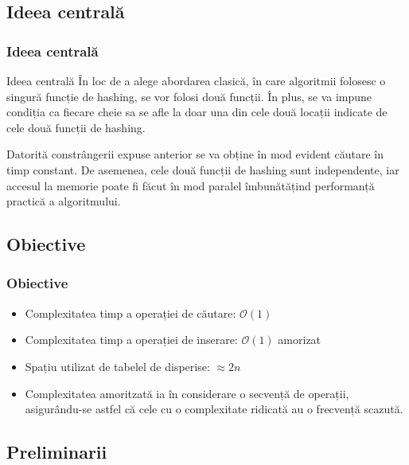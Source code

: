 \documentclass{beamer}
\begin{document}
\begin{frame}
\subsection{Ideea centrală}
\frametitle{Ideea centrală}
\begin{block}{Ideea centrală}
În loc de a alege abordarea clasică, în care algoritmii folosesc o singură funcție de hashing, se vor folosi două funcții. În plus, se va impune condiția ca fiecare cheie sa se afle la doar una din cele două locații indicate de cele două funcții de hashing.
\end{block}


Datorită constrângerii expuse anterior se va obține în mod evident căutare în timp constant. De asemenea, cele două funcții de hashing sunt independente, iar accesul la memorie poate fi făcut în mod paralel îmbunătățind performanță practică a algoritmului.

\end{frame}
\subsection{Obiective}

\begin{frame}
\frametitle{Obiective}
\begin{itemize}
\item Complexitatea timp a operației de căutare: $\mathcal{O}(1)$
\item Complexitatea timp a operației de inserare: $\mathcal{O}(1)$ amorizat
\item Spațiu utilizat de tabelel de disperise: $\approx 2n$

\item Complexitatea amoritzată ia în considerare o secvență de operații, asigurându-se astfel că cele cu o complexitate ridicată au o frecvență scazută.
\end{itemize}

\end{frame}
\subsection{Preliminarii}
\end{document}
